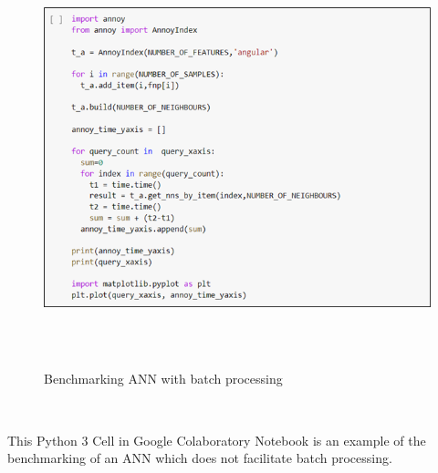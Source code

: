 \documentclass[12pt]{article}
\renewcommand{\_}{\kern-1.5pt\textunderscore\kern-1.5pt}
\begin{document}
\begin{Center}



\begin{figure}[H]
	\begin{Center}
		\includegraphics[width=6.15in,height=4.78in]{./media/image10.png}
		\caption{Benchmarking ANN with batch processing}
		\label{fig:Benchmarking_ANN_with_batch_processing}
	\end{Center}
\end{figure}



\\

\end{Center}\par

\begin{justify}
This Python 3 Cell in Google Colaboratory Notebook is an example of the benchmarking of an ANN which does not facilitate batch processing.
\end{justify}\par
\end{document}
